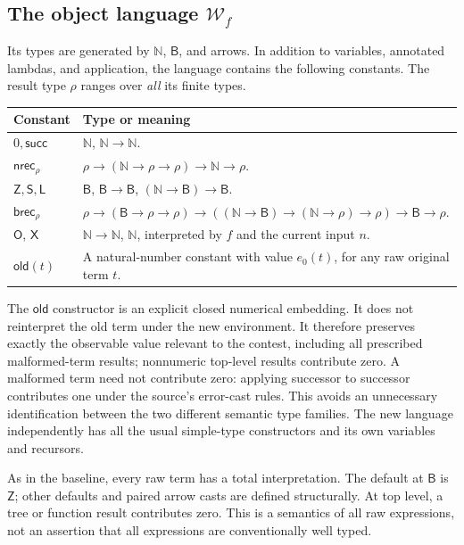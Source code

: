 \documentclass[11pt,a4paper]{article}
\theoremstyle{definition}
\newcommand{\N}{\mathbb N}
\newcommand{\B}{\mathsf B}
\begin{document}
\subsection{The object language \texorpdfstring{\(\mathcal W_f\)}{W(f)}}

Its types are generated by \(\N\), \(\B\), and arrows. In addition to variables,
annotated lambdas, and application, the language contains the following
constants. The result type \(\rho\) ranges over \emph{all} its finite types.

\begin{center}
\begin{tabularx}{\linewidth}{@{}lX@{}}
\toprule
Constant & Type or meaning\\
\midrule
\(0,\mathsf{succ}\) & \(\N\), \(\N\to\N\).\\
\(\mathsf{nrec}_{\rho}\) &
\(\rho\to(\N\to\rho\to\rho)\to\N\to\rho\).\\
\(\mathsf Z,\mathsf S,\mathsf L\) &
\(\B\), \(\B\to\B\), \((\N\to\B)\to\B\).\\
\(\mathsf{brec}_{\rho}\) &
\(\rho\to(\B\to\rho\to\rho)\to
((\N\to\B)\to(\N\to\rho)\to\rho)\to\B\to\rho\).\\
\(\mathsf O\), \(\mathsf X\) &
\(\N\to\N\), \(\N\), interpreted by \(f\) and the current input \(n\).\\
\(\mathsf{old}(t)\) & A natural-number constant with value \(e_0(t)\), for
any raw original term \(t\).\\
\bottomrule
\end{tabularx}
\end{center}

The \(\mathsf{old}\) constructor is an explicit closed numerical embedding.
It does not reinterpret the old term under the new environment. It therefore
preserves exactly the observable value relevant to the contest, including
all prescribed malformed-term results; nonnumeric top-level results
contribute zero. A malformed term need not contribute zero: applying
successor to successor contributes one under the source's error-cast rules.
This avoids an unnecessary identification between the two different
semantic type families.
The new language independently has all the usual simple-type constructors
and its own variables and recursors.

As in the baseline, every raw term has a total interpretation. The default
at \(\B\) is \(\mathsf Z\); other defaults and paired arrow casts are defined
structurally. At top level, a tree or function result contributes zero. This
is a semantics of all raw expressions, not an assertion that all expressions
are conventionally well typed.
\end{document}
